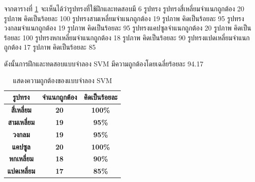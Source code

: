 \begin{enumerate}
			จากตารางที่ \ref{tab:SVM} 
			จะเห็นได้ว่ารูปทรงที่ใช้ฝึกและทดสอบมี 6 รูปทรง 
			รูปทรงสี่เหลี่ยมจำแนกถูกต้อง 20 รูปภาพ คิดเป็นร้อยละ 100 
			รูปทรงสามเหลี่ยมจำแนกถูกต้อง 19 รูปภาพ คิดเป็นร้อยละ 95 
			รูปทรงวงกลมจำแนกถูกต้อง 19 รูปภาพ คิดเป็นร้อยละ 95 
			รูปทรงแคปซูลจำแนกถูกต้อง 20 รูปภาพ คิดเป็นร้อยละ 100 
			รูปทรงหกเหลี่ยมจำแนกถูกต้อง 18 รูปภาพ คิดเป็นร้อยละ 90 
			รูปทรงแปดเหลี่ยมจำแนกถูกต้อง 17 รูปภาพ คิดเป็นร้อยละ 85 
			
			ดังนั้นการฝึกและทดสอบแบบจำลอง SVM มีความถูกต้องโดยเฉลี่ยร้อยละ 94.17

			\begin{table}[H]
				\centering
				\caption{แสดงความถูกต้องของแบบจำลอง SVM}
				\label{tab:SVM}
				\begin{tabular}{|p{4cm}|p{4cm}|p{4cm}|}
				\hline
				\multicolumn{1}{|c}{\textbf{รูปทรง}} &
				\multicolumn{1}{|c}{\textbf{จำแนกถูกต้อง}} &
				\multicolumn{1}{|c|}{\textbf{คิดเป็นร้อยละ}} \\ \hline
				\multicolumn{1}{|c}{\textbf{สี่เหลี่ยม}}   & 
				\multicolumn{1}{|c}{\textbf{20}}  &  
				\multicolumn{1}{|c|}{\textbf{100\%}}  \\ \hline
				\multicolumn{1}{|c}{\textbf{สามเหลี่ยม}} & 
				\multicolumn{1}{|c}{\textbf{19}}  &  
				\multicolumn{1}{|c|}{\textbf{95\%}}  \\ \hline
				\multicolumn{1}{|c}{\textbf{วงกลม}}    & 
				\multicolumn{1}{|c}{\textbf{19}}  & 
				\multicolumn{1}{|c|}{\textbf{95\%}}  \\ \hline
				\multicolumn{1}{|c}{\textbf{แคปซูล}}   &  
				\multicolumn{1}{|c}{\textbf{20}} &  
				\multicolumn{1}{|c|}{\textbf{100\%}} \\ \hline
				\multicolumn{1}{|c}{\textbf{หกเหลี่ยม}}  & 
				\multicolumn{1}{|c}{\textbf{18}}  & 
				\multicolumn{1}{|c|}{\textbf{90\%}}   \\ \hline
				\multicolumn{1}{|c}{\textbf{แปดเหลี่ยม}} & 
				\multicolumn{1}{|c}{\textbf{17}}  &  
				\multicolumn{1}{|c|}{\textbf{85\%}}  \\ \hline
				\end{tabular}
			\end{table}
			

\end{enumerate}
